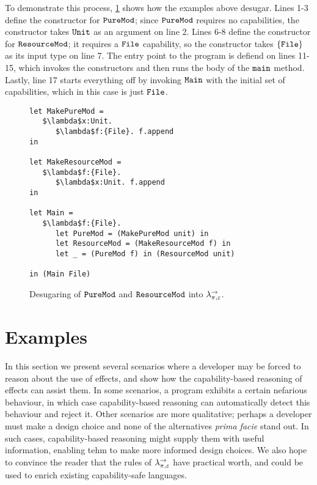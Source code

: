 To demonstrate this process, \ref{fig:wyv_tutorial_desugaring} shows how the examples above desugar. Lines 1-3 define the constructor for $\mathtt{PureMod}$; since $\mathtt{PureMod}$ requires no capabilities, the constructor takes $\mathtt{Unit}$ as an argument on line 2. Lines 6-8 define the constructor for $\mathtt{ResourceMod}$; it requires a $\mathtt{File}$ capability, so the constructor takes $\mathtt{\{File\}}$ as its input type on line 7. The entry point to the program is defiend on lines 11-15, which invokes the constructors and then runs the body of the $\mathtt{main}$ method. Lastly, line 17 starts everything off by invoking $\mathtt{Main}$ with the initial set of capabilities, which in this case is just $\mathtt{File}$.

\begin{figure}[h]

\begin{lstlisting}
let MakePureMod =
   $\lambda$x:Unit.
      $\lambda$f:{File}. f.append
in

let MakeResourceMod =
   $\lambda$f:{File}.
      $\lambda$x:Unit. f.append
in

let Main =
   $\lambda$f:{File}.
      let PureMod = (MakePureMod unit) in
      let ResourceMod = (MakeResourceMod f) in
      let _ = (PureMod f) in (ResourceMod unit)

in (Main File)
\end{lstlisting}

\caption{Desugaring of $\mathtt{PureMod}$ and $\mathtt{ResourceMod}$ into $\lambda^{\rightarrow}_{\pi, \varepsilon}$.}
\label{fig:wyv_tutorial_desugaring}
\end{figure}




\section{Examples}

In this section we present several scenarios where a developer may be forced to reason about the use of effects, and show how the capability-based reasoning of effects can assist them. In some scenarios, a program exhibits a certain nefarious behaviour, in which case capability-based reasoning can automatically detect this behaviour and reject it. Other scenarios are more qualitative; perhaps a developer must make a design choice and none of the alternatives \textit{prima facie} stand out. In such cases, capability-based reasoning might supply them with useful information, enabling tehm to make more informed design choices. We also hope to convince the reader that the rules of $\lambda^{\rightarrow}_{\pi, \varepsilon}$ have practical worth, and could be used to enrich existing capability-safe languages.

